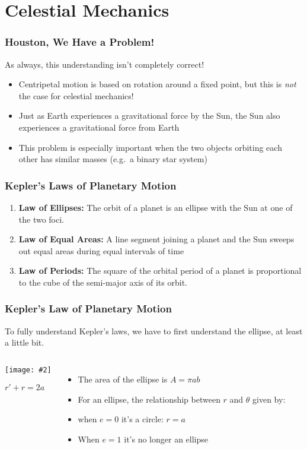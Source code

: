 \documentclass[12pt,compress,aspectratio=169]{beamer}
\newcommand{\pic}[2]{\texttt{[image: \#2]}}
\newcommand{\eq}[2]{\vspace{#1}{\Large\begin{displaymath}#2\end{displaymath}}}
\begin{document}
\section{Celestial Mechanics}


\begin{frame}
  \frametitle{Houston, We Have a Problem!}
  As always, this understanding isn't completely correct!
  \begin{itemize}
  \item Centripetal motion is based on rotation around a fixed point, but this
    is \emph{not} the case for celestial mechanics!
  \item Just as Earth experiences a gravitational force by the Sun, the Sun
    also experiences a gravitational force from Earth
  \item This problem is especially important when the two objects orbiting each
    other has similar masses (e.g.\ a binary star system)
  \end{itemize}
\end{frame}


\begin{frame}
  \frametitle{Kepler's Laws of Planetary Motion}
  \begin{enumerate}
  \item\textbf{Law of Ellipses:} The orbit of a planet is an ellipse with the
    Sun at one of the two foci.
  \item\textbf{Law of Equal Areas:} A line segment joining a planet and the Sun
    sweeps out equal areas during equal intervals of time
  \item \textbf{Law of Periods:} The square of the orbital period of a planet
    is proportional to the cube of the semi-major axis of its orbit.
  \end{enumerate}
\end{frame}


\begin{frame}
  \frametitle{Kepler's Law of Planetary Motion}
  To fully understand Kepler's laws, we have to first understand the ellipse,
  at least a little bit.

  \begin{columns}
    \begin{center}
      \pic{1.25}{elliporb.png}
      
      $r' + r =2a$
    \end{center}

    \begin{itemize}
    \item The area of the ellipse is $A=\pi ab$
    \item For an ellipse, the relationship between $r$ and $\theta$ given by:

      \eq{-.35in}{
        r=\frac{a(1-e^2)}{1+e\cos\theta}
        \quad\textnormal{\normalsize where}\quad
        0\leq e < 1
      }
    \item when $e=0$ it's a circle: $r=a$
    \item When $e=1$ it's no longer an ellipse
    \end{itemize}
  \end{columns}
\end{frame}
\end{document}
